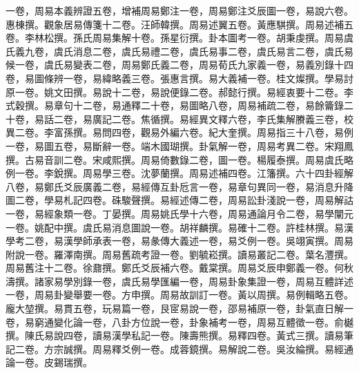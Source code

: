 \begin{pinyinscope}
一卷，周易本義辨證五卷，增補周易鄭注一卷，周易鄭注爻辰圖一卷，易說六卷。惠棟撰。觀象居易傳箋十二卷。汪師韓撰。周易述翼五卷。黃應騏撰。周易述補五卷。李林松撰。孫氏周易集解十卷。孫星衍撰。卦本圖考一卷。胡秉虔撰。周易虞氏義九卷，虞氏消息二卷，虞氏易禮二卷，虞氏易事二卷，虞氏易言二卷，虞氏易候一卷，虞氏易變表二卷，周易鄭氏義二卷，周易荀氏九家義一卷，易義別錄十四卷，易圖條辨一卷，易緯略義三卷。張惠言撰。易大義補一卷。桂文燦撰。學易討原一卷。姚文田撰。易說十二卷，易說便錄二卷。郝懿行撰。易經衷要十二卷。李式穀撰。易章句十二卷，易通釋二十卷，易圖略八卷，周易補疏二卷，易餘籥錄二十卷，易話二卷，易廣記二卷。焦循撰。易經異文釋六卷，李氏集解賸義三卷，校異二卷。李富孫撰。易問四卷，觀易外編六卷。紀大奎撰。周易指三十八卷，易例一卷，易圖五卷，易斷辭一卷。端木國瑚撰。卦氣解一卷，周易考異二卷。宋翔鳳撰。古易音訓二卷。宋咸熙撰。周易倚數錄二卷，圖一卷。楊履泰撰。周易虞氏略例一卷。李銳撰。周易學三卷。沈夢蘭撰。周易述補四卷。江籓撰。六十四卦經解八卷，易鄭氏爻辰廣義二卷，易經傳互卦卮言一卷，易章句異同一卷，易消息升降圖二卷，學易札記四卷。硃駿聲撰。易經述傳二卷，周易訟卦淺說一卷，周易解詁一卷，易經象類一卷。丁晏撰。周易姚氏學十六卷，周易通論月令二卷，易學闡元一卷。姚配中撰。虞氏易消息圖說一卷。胡祥麟撰。易確十二卷。許桂林撰。易漢學考二卷，易漢學師承表一卷，易彖傳大義述一卷，易爻例一卷。吳翊寅撰。周易附說一卷。羅澤南撰。周易舊疏考證一卷。劉毓崧撰。讀易叢記二卷。葉名灃撰。周易舊注十二卷。徐鼐撰。鄭氏爻辰補六卷。戴棠撰。周易爻辰申鄭義一卷。何秋濤撰。諸家易學別錄一卷，虞氏易學匯編一卷，周易卦象集證一卷，周易互體詳述一卷，周易卦變舉要一卷。方申撰。周易故訓訂一卷。黃以周撰。易例輯略五卷。龐大堃撰。易貫五卷，玩易篇一卷，艮宧易說一卷，邵易補原一卷，卦氣直日解一卷，易窮通變化論一卷，八卦方位說一卷，卦象補考一卷，周易互體徵一卷。俞樾撰。陳氏易說四卷，讀易漢學私記一卷。陳壽熊撰。易釋四卷。黃式三撰。讀易筆記二卷。方宗誠撰。周易釋爻例一卷。成蓉鏡撰。易解說二卷。吳汝綸撰。易經通論一卷。皮錫瑞撰。


\end{pinyinscope}
